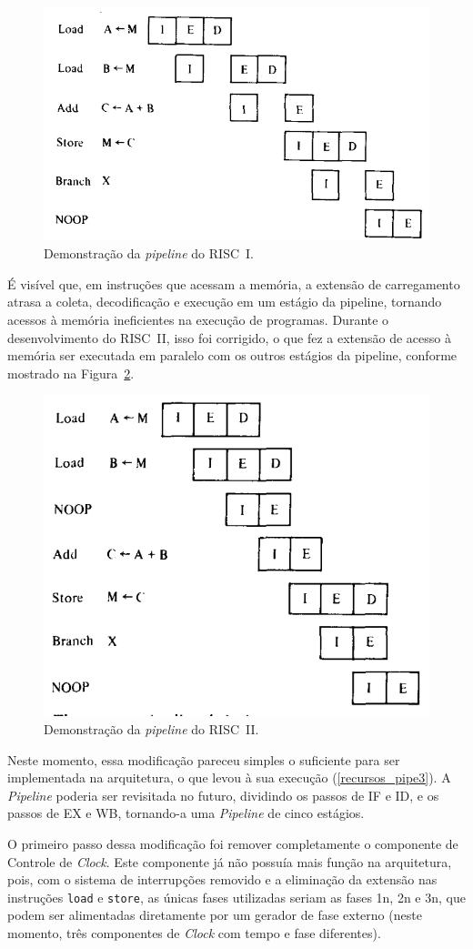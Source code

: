 \documentclass[
	12pt,				%
	openright,			%
	oneside,			%
	a4paper,			%
	english,			%
	french,				%
	spanish,			%
	brazil,				%
	]{abntex2}
\begin{document}
\begin{figure}[h]
    \centering
    \includegraphics[width=0.5\linewidth]{ProcessoDesenvolvimento/Arquitetura/pipelineRISCI.png}
    \caption{Demonstração da \textit{pipeline} do RISC~I.\cite{stallings_reduced_1988}}
    \label{fig:pipelineRISCI}
\end{figure}

É visível que, em instruções que acessam a memória, a extensão de carregamento atrasa a coleta, decodificação e execução em um estágio da pipeline, tornando acessos à memória ineficientes na execução de programas. Durante o desenvolvimento do RISC~II, isso foi corrigido, o que fez a extensão de acesso à memória ser executada em paralelo com os outros estágios da pipeline, conforme mostrado na Figura~\ref{fig:pipelineRISCII}.

\begin{figure}[h]
    \centering
    \includegraphics[width=0.5\linewidth]{ProcessoDesenvolvimento/Arquitetura/PipelineRISCII.png}
    \caption{Demonstração da \textit{pipeline} do RISC~II.\cite{stallings_reduced_1988}}
    \label{fig:pipelineRISCII}
\end{figure}

Neste momento, essa modificação pareceu simples o suficiente para ser implementada na arquitetura, o que levou à sua execução (\ref{recursos_pipe3}). A \textit{Pipeline} poderia ser revisitada no futuro, dividindo os passos de IF e ID, e os passos de EX e WB, tornando-a uma \textit{Pipeline} de cinco estágios.

O primeiro passo dessa modificação foi remover completamente o componente de Controle de \textit{Clock}. Este componente já não possuía mais função na arquitetura, pois, com o sistema de interrupções removido e a eliminação da extensão nas instruções \texttt{load} e \texttt{store}, as únicas fases utilizadas seriam as fases 1n, 2n e 3n, que podem ser alimentadas diretamente por um gerador de fase externo (neste momento, três componentes de \textit{Clock} com tempo e fase diferentes).
\end{document}

